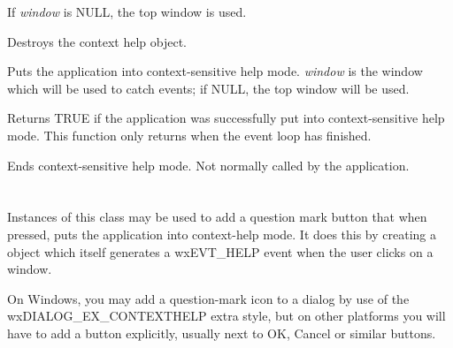 If {\it window} is NULL, the top window is used.



Destroys the context help object.

\label{wxcontexthelpbegincontexthelp}


Puts the application into context-sensitive help mode. {\it window} is the window
which will be used to catch events; if NULL, the top window will be used.

Returns TRUE if the application was successfully put into context-sensitive help mode.
This function only returns when the event loop has finished.

\label{wxcontexthelpendcontexthelp}


Ends context-sensitive help mode. Not normally called by the application.

\section{}\label{wxcontexthelpbutton}

Instances of this class may be used to add a question mark button that when pressed, puts the
application into context-help mode. It does this by creating a  object which itself
generates a wxEVT\_HELP event when the user clicks on a window.

On Windows, you may add a question-mark icon to a dialog by use of the wxDIALOG\_EX\_CONTEXTHELP extra style, but
on other platforms you will have to add a button explicitly, usually next to OK, Cancel or similar buttons.


\\
\\
\\
\\
\\

